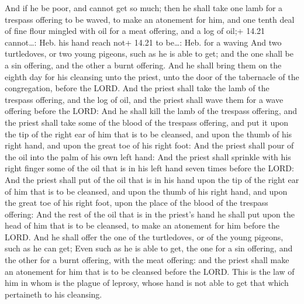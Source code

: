  And if he be poor, and cannot get so much; then he shall
take one lamb for a trespass offering to be waved, to make an atonement
for him, and one tenth deal of fine flour mingled with oil for a meat
offering, and a log of oil;+ 14.21 cannot\ldots: Heb. his hand reach
not+ 14.21 to be\ldots: Heb. for a waving  And two
turtledoves, or two young pigeons, such as he is able to get; and the
one shall be a sin offering, and the other a burnt offering.
 And he shall bring them on the eighth day for his
cleansing unto the priest, unto the door of the tabernacle of the
congregation, before the LORD.  And the priest shall take
the lamb of the trespass offering, and the log of oil, and the priest
shall wave them for a wave offering before the LORD:  And
he shall kill the lamb of the trespass offering, and the priest shall
take some of the blood of the trespass offering, and put it upon the tip
of the right ear of him that is to be cleansed, and upon the thumb of
his right hand, and upon the great toe of his right foot: 
And the priest shall pour of the oil into the palm of his own left hand:
 And the priest shall sprinkle with his right finger some
of the oil that is in his left hand seven times before the LORD:
 And the priest shall put of the oil that is in his hand
upon the tip of the right ear of him that is to be cleansed, and upon
the thumb of his right hand, and upon the great toe of his right foot,
upon the place of the blood of the trespass offering:  And
the rest of the oil that is in the priest's hand he shall put upon the
head of him that is to be cleansed, to make an atonement for him before
the LORD.  And he shall offer the one of the turtledoves,
or of the young pigeons, such as he can get;  Even such as
he is able to get, the one for a sin offering, and the other for a burnt
offering, with the meat offering: and the priest shall make an atonement
for him that is to be cleansed before the LORD.  This is
the law of him in whom is the plague of leprosy, whose hand is not able
to get that which pertaineth to his cleansing.

